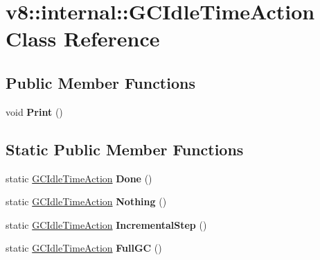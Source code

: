 \hypertarget{classv8_1_1internal_1_1GCIdleTimeAction}{}\section{v8\+:\+:internal\+:\+:G\+C\+Idle\+Time\+Action Class Reference}
\label{classv8_1_1internal_1_1GCIdleTimeAction}
\subsection*{Public Member Functions}
\begin{DoxyCompactItemize}
\item 
\mbox{\label{classv8_1_1internal_1_1GCIdleTimeAction_ac951633897220ff928cbc7116c6b706b}} 
void {\bfseries Print} ()
\end{DoxyCompactItemize}
\subsection*{Static Public Member Functions}
\begin{DoxyCompactItemize}
\item 
\mbox{\label{classv8_1_1internal_1_1GCIdleTimeAction_a3a3f464e601fdd36eff7930a93d8aebe}} 
static \mbox{\hyperlink{classv8_1_1internal_1_1GCIdleTimeAction}{G\+C\+Idle\+Time\+Action}} {\bfseries Done} ()
\item 
\mbox{\label{classv8_1_1internal_1_1GCIdleTimeAction_ab367e637dc13755126195e0fd9c9de5c}} 
static \mbox{\hyperlink{classv8_1_1internal_1_1GCIdleTimeAction}{G\+C\+Idle\+Time\+Action}} {\bfseries Nothing} ()
\item 
\mbox{\label{classv8_1_1internal_1_1GCIdleTimeAction_a9ad30f42a1bdbe55f5d69ae6568ebe70}} 
static \mbox{\hyperlink{classv8_1_1internal_1_1GCIdleTimeAction}{G\+C\+Idle\+Time\+Action}} {\bfseries Incremental\+Step} ()
\item 
\mbox{\label{classv8_1_1internal_1_1GCIdleTimeAction_a83a3580041a8923c2e010c18a214e812}} 
static \mbox{\hyperlink{classv8_1_1internal_1_1GCIdleTimeAction}{G\+C\+Idle\+Time\+Action}} {\bfseries Full\+GC} ()
\end{DoxyCompactItemize}
